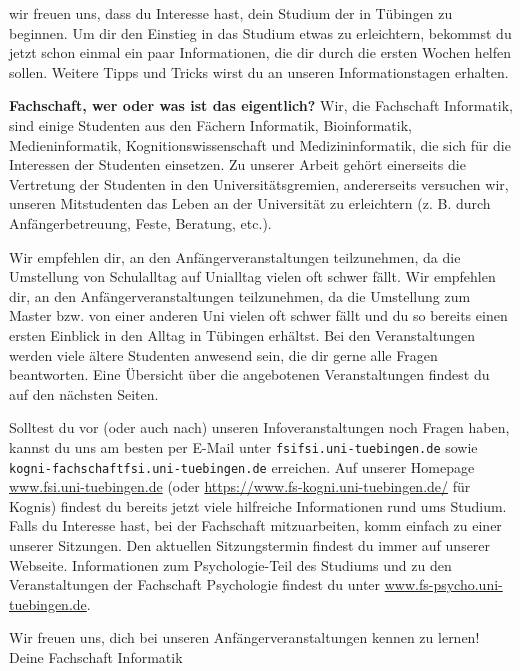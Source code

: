 wir freuen uns, dass du Interesse hast, dein Studium der \studiengang in Tübingen zu beginnen.
Um dir den Einstieg in das Studium etwas zu erleichtern, bekommst du jetzt schon einmal
ein paar Informationen, die dir durch die ersten Wochen helfen sollen.
Weitere Tipps und Tricks wirst du an unseren Informationstagen %
erhalten.

\textbf{\glqq Fachschaft\grqq, wer oder was ist das eigentlich?} Wir, die Fachschaft Informatik, sind einige Studenten aus den Fächern
Informatik, Bioinformatik, Medieninformatik, Kognitionswissenschaft und Medizin\-informatik, die sich für die Interessen der Studenten einsetzen. Zu unserer Arbeit
gehört einerseits die Vertretung der Studenten in den Universitätsgremien, andererseits versuchen wir, unseren
Mitstudenten das Leben an der Universität zu erleichtern (z. B. durch Anfängerbetreuung, Feste,
Beratung, etc.).

\ifbachelor 
Wir empfehlen dir, an den Anfängerveranstaltungen teilzunehmen, da die Umstellung von Schulalltag
auf Unialltag vielen oft schwer fällt. 
\fi
\ifmaster
Wir empfehlen dir, an den Anfängerveranstaltungen teilzunehmen, da die Umstellung zum Master bzw. von einer anderen Uni vielen oft schwer fällt und du so bereits einen ersten Einblick in den Alltag in Tübingen erhältst.
\fi 
Bei den Veranstaltungen werden viele ältere Studenten
anwesend sein, die dir gerne alle Fragen beantworten. Eine Übersicht über die angebotenen
Veranstaltungen findest du auf den nächsten Seiten.

Solltest du vor (oder auch nach) unseren Infoveranstaltungen noch Fragen haben, kannst du uns
am besten per E-Mail unter \texttt{fsi\At fsi.uni-tuebingen.de} 
\ifkogwiss
sowie \texttt{kogni-fachschaft\At fsi.uni-tuebingen.de}
\fi
erreichen. Auf unserer Homepage
\url{www.fsi.uni-tuebingen.de} (oder \url{https://www.fs-kogni.uni-tuebingen.de/} für Kognis) findest du bereits jetzt viele hilfreiche Informationen rund
ums Studium. Falls du Interesse hast, bei der Fachschaft mitzuarbeiten, komm einfach zu einer unserer Sitzungen. Den aktuellen Sitzungstermin findest du immer auf unserer Webseite.
\ifkogwiss  Informationen zum Psychologie-Teil des Studiums und zu den Veranstaltungen der
Fachschaft Psychologie findest du unter \url{www.fs-psycho.uni-tuebingen.de}.\fi

Wir freuen uns, dich bei unseren Anfängerveranstaltungen kennen zu lernen!\\
Deine Fachschaft Informatik
\vfill
